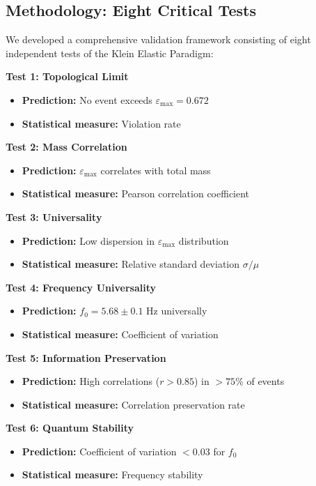 \documentclass[12pt,a4paper]{article}
\newcommand{\epsilonmax}{\varepsilon_{\text{max}}}
\newcommand{\fzero}{f_0}
\begin{document}
\subsection{Methodology: Eight Critical Tests}

We developed a comprehensive validation framework consisting of eight independent tests of the Klein Elastic Paradigm:

\textbf{Test 1: Topological Limit}
\begin{itemize}
    \item \textbf{Prediction:} No event exceeds $\epsilonmax = 0.672$
    \item \textbf{Statistical measure:} Violation rate
\end{itemize}

\textbf{Test 2: Mass Correlation}
\begin{itemize}
    \item \textbf{Prediction:} $\epsilonmax$ correlates with total mass
    \item \textbf{Statistical measure:} Pearson correlation coefficient
\end{itemize}

\textbf{Test 3: Universality}
\begin{itemize}
    \item \textbf{Prediction:} Low dispersion in $\epsilonmax$ distribution
    \item \textbf{Statistical measure:} Relative standard deviation $\sigma/\mu$
\end{itemize}

\textbf{Test 4: Frequency Universality}
\begin{itemize}
    \item \textbf{Prediction:} $\fzero = 5.68 \pm 0.1$ Hz universally
    \item \textbf{Statistical measure:} Coefficient of variation
\end{itemize}

\textbf{Test 5: Information Preservation}
\begin{itemize}
    \item \textbf{Prediction:} High correlations ($r > 0.85$) in $>75\%$ of events
    \item \textbf{Statistical measure:} Correlation preservation rate
\end{itemize}

\textbf{Test 6: Quantum Stability}
\begin{itemize}
    \item \textbf{Prediction:} Coefficient of variation $< 0.03$ for $\fzero$
    \item \textbf{Statistical measure:} Frequency stability
\end{itemize}
\end{document}
